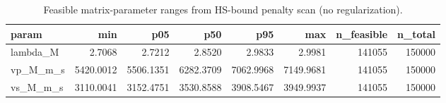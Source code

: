 \begin{table}[ht!]
\centering
\caption{Feasible matrix-parameter ranges from HS-bound penalty scan (no regularization).}
\label{tab:hs\_feasible\_minmax}
\begin{tabular}{lrrrrrrr}
\toprule
\textbf{param} & \textbf{min} & \textbf{p05} & \textbf{p50} & \textbf{p95} & \textbf{max} & \textbf{n\_feasible} & \textbf{n\_total} \\
\midrule
lambda\_M & 2.7068 & 2.7212 & 2.8520 & 2.9833 & 2.9981 & 141055 & 150000 \\
vp\_M\_m\_s & 5420.0012 & 5506.1351 & 6282.3709 & 7062.9968 & 7149.9681 & 141055 & 150000 \\
vs\_M\_m\_s & 3110.0041 & 3152.4751 & 3530.8588 & 3908.5467 & 3949.9937 & 141055 & 150000 \\
\bottomrule
\end{tabular}
\end{table}
